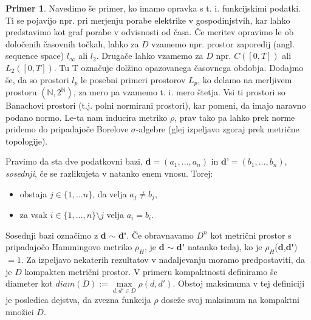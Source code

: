 \documentclass[12pt,a4paper]{amsart}
\theoremstyle{definition} %
\newtheorem{primer}[definicija]{Primer}
\theoremstyle{plain} %
\begin{document}
\begin{primer}
Navedimo še primer, ko imamo opravka s t. i. funkcijskimi podatki. Ti se pojavijo npr. pri merjenju porabe elektrike v gospodinjstvih, kar lahko predstavimo kot graf porabe v odvisnosti od časa. Če meritev opravimo le ob določenih časovnih točkah, lahko za $D$ vzamemo npr. prostor zaporedij (angl. sequence space) $l_{\infty}$ ali $l_{2}$. Drugače lahko vzamemo za $D$ npr. $C([0,T])$ ali $L_{2}([0,T])$. Tu T označuje dolžino opazovanega časovnega obdobja. Dodajmo še, da so prostori $l_p$ le posebni primeri prostorov $L_p$, ko delamo na merljivem prostoru $(\mathbb{N}, 2^\mathbb{N})$, za mero pa vzamemo t. i. mero štetja. Vsi ti prostori so Banachovi prostori (t.j. polni normirani prostori), kar pomeni, da imajo naravno podano normo. Le-ta nam inducira metriko $\rho$, prav tako pa lahko prek norme pridemo do pripadajoče Borelove $\sigma$-algebre (glej izpeljavo zgoraj prek metrične topologije). 
\end{primer}
\newline
\newline
Pravimo da sta dve podatkovni bazi, \textbf{d}$= (a_{1},...,a_{n})$ in $\textbf{d'}= (b_{1},...,b_{n})$,  \textit{sosednji}, če se razlikujeta v natanko enem vnosu. Torej:
\begin{itemize}
\item obstaja $j\in\{1,...n\}$, da velja $a_{j} \neq b_{j}$,
\item za vsak $i\in\{1,...,n\} \setminus j$ velja $a_{i} = b_{i}$.
\end{itemize}
Sosednji bazi označimo z \textbf{d} $\sim$ \textbf{d\'}. Če obravnavamo $D^n$ kot metrični prostor s pripadajočo Hammingovo metriko $\rho_{H}$, je \textbf{d} $\sim$ \textbf{d\'} natanko tedaj, ko je $\rho_{H}$(\textbf{d},\textbf{d\'})$=1$.
\newline
\newline
Za izpeljavo nekaterih rezultatov v nadaljevanju moramo predpostaviti, da je $D$ kompakten metrični prostor. V primeru kompaktnosti definiramo še diameter kot $diam(D) := \max\limits_{d,d' \in D}\rho(d,d')$. Obstoj maksimuma v tej definiciji je posledica dejstva, da zvezna funkcija $\rho$ doseže svoj maksimum na kompaktni množici $D$.
\end{document}
